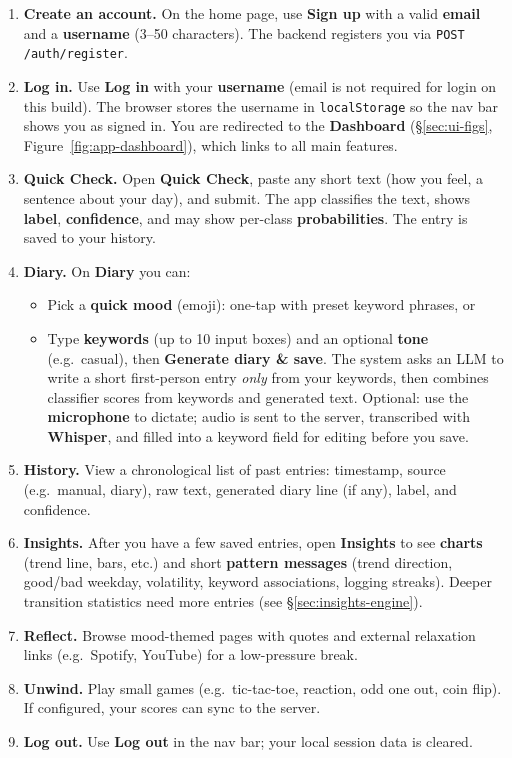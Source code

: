 \documentclass[11pt,a4paper]{article}
\begin{document}
\begin{enumerate}[itemsep=0.35em, leftmargin=1.4em, label=\textbf{\sffamily\color{MMnavyL}\arabic*}.]
  \item \textbf{Create an account.} On the home page, use \textbf{Sign up} with a valid \textbf{email} and a \textbf{username} (3--50 characters). The backend registers you via \texttt{POST /auth/register}.
  \item \textbf{Log in.} Use \textbf{Log in} with your \textbf{username} (email is not required for login on this build). The browser stores the username in \texttt{localStorage} so the nav bar shows you as signed in. You are redirected to the \textbf{Dashboard} (\S\ref{sec:ui-figs}, Figure~\ref{fig:app-dashboard}), which links to all main features.
  \item \textbf{Quick Check.} Open \textbf{Quick Check}, paste any short text (how you feel, a sentence about your day), and submit. The app classifies the text, shows \textbf{label}, \textbf{confidence}, and may show per-class \textbf{probabilities}. The entry is saved to your history.
  \item \textbf{Diary.} On \textbf{Diary} you can:
  \begin{itemize}[itemsep=0.25em]
    \item Pick a \textbf{quick mood} (emoji): one-tap with preset keyword phrases, or
    \item Type \textbf{keywords} (up to 10 input boxes) and an optional \textbf{tone} (e.g.\ casual), then \textbf{Generate diary \& save}. The system asks an LLM to write a short first-person entry \emph{only} from your keywords, then combines classifier scores from keywords and generated text. Optional: use the \textbf{microphone} to dictate; audio is sent to the server, transcribed with \textbf{Whisper}, and filled into a keyword field for editing before you save.
  \end{itemize}
  \item \textbf{History.} View a chronological list of past entries: timestamp, source (e.g.\ manual, diary), raw text, generated diary line (if any), label, and confidence.
  \item \textbf{Insights.} After you have a few saved entries, open \textbf{Insights} to see \textbf{charts} (trend line, bars, etc.) and short \textbf{pattern messages} (trend direction, good/bad weekday, volatility, keyword associations, logging streaks). Deeper transition statistics need more entries (see \S\ref{sec:insights-engine}).
  \item \textbf{Reflect.} Browse mood-themed pages with quotes and external relaxation links (e.g.\ Spotify, YouTube) for a low-pressure break.
  \item \textbf{Unwind.} Play small games (e.g.\ tic-tac-toe, reaction, odd one out, coin flip). If configured, your scores can sync to the server.
  \item \textbf{Log out.} Use \textbf{Log out} in the nav bar; your local session data is cleared.
\end{enumerate}
\end{document}
